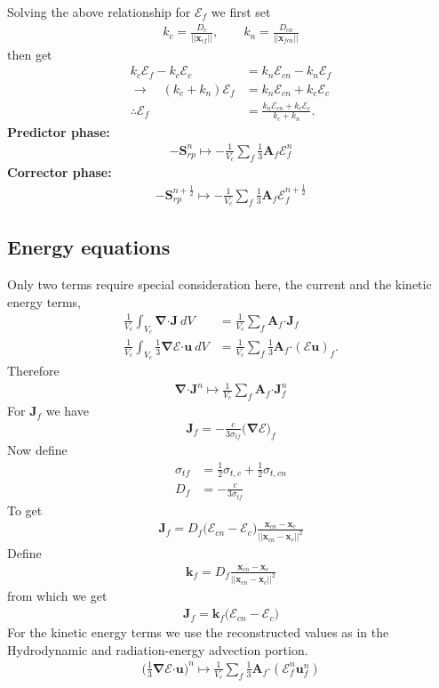 \documentclass[10pt,letterpaper,notitlepage]{article}
\numberwithin{equation}{section}
\newcommand{\bnabla}{\boldsymbol{\nabla}}
\newcommand{\position}{\mathbf{x}}
\newcommand{\velocity}{\mathbf{u}}
\newcommand{\dotp}{\boldsymbol{\cdot}}
\newcommand{\RadE}{\mathcal{E}}
\newcommand{\RadJ}{\mathbf{J}}
\newcommand{\AreaVec}{\mathbf{A}}
\newcommand{\half}{\frac{1}{2}}
\newcommand{\beq}{\begin{equation*} \begin{aligned}}
\newcommand{\eeq}{\end{aligned}\end{equation*}}
\newcommand{\beqn}{\begin{equation}\begin{aligned}}
\newcommand{\eeqn}{\end{aligned}\end{equation}}
\begin{document}
Solving the above relationship for $\RadE_f$ we first set
\beq 
k_c = \frac{D_c}{||\position_{cf}||} , \quad \quad
k_n = \frac{D_{cn}}{||\position_{fcn}||}
\eeq 
then get
\beqn 
k_c \RadE_f - k_c \RadE_c &= k_n \RadE_{cn} - k_n \RadE_f \\
\to \quad 
(k_c + k_n) \RadE_f &= k_n \RadE_{cn} + k_c \RadE_c \\
\therefore
\RadE_f &= \frac{k_n \RadE_{cn} + k_c \RadE_c}{k_c +k_n} .
\eeqn 
\newline
\newline 
\textbf{Predictor phase:} \newline 
\beqn
-\mathbf{S}_{rp} ^n\mapsto  -\frac{1}{V_c}  \sum_f  \frac{1}{3} \AreaVec_f \RadE_f^n
\eeqn
\textbf{Corrector phase:} \newline 
\beqn
-\mathbf{S}_{rp} ^{n+\half} \mapsto  -\frac{1}{V_c}  \sum_f  \frac{1}{3} \AreaVec_f \RadE_f^{n+\half}
\eeqn

\subsection{Energy equations}
Only two terms require special consideration here, the current and the kinetic energy terms,
\beqn 
\frac{1}{V_c} \int_{V_c} \bnabla \dotp \RadJ \ dV &= \frac{1}{V_c} \sum_f \AreaVec_f \dotp \RadJ_f \\
\frac{1}{V_c} \int_{V_c} \frac{1}{3} \bnabla \RadE \dotp \velocity \ dV &= \frac{1}{V_c} \sum_f \frac{1}{3} \AreaVec_f \dotp (\RadE \velocity)_f.
\eeqn 
Therefore
\beqn 
\bnabla \dotp \RadJ^n \mapsto \frac{1}{V_c} \sum_f \AreaVec_f \dotp \RadJ_f^n
\eeqn 
For $\RadJ_f$ we have
\beqn 
\RadJ_f = - \frac{c}{3\sigma_{tf}} \bigr(\bnabla \RadE \bigr)_f
\eeqn 
Now define
\beqn
\sigma_{tf} &= \half \sigma_{t,c} + \half \sigma_{t,cn} \\
D_f &= - \frac{c}{3\sigma_{tf}}
\eeqn 
To get
\beqn 
\RadJ_f = D_f \bigr( \RadE_{cn} - \RadE_{c} \bigr) \frac{\position_{cn} - \position_{c}}{|| \position_{cn} - \position_{c} ||^2}
\eeqn 
Define
\beqn 
\mathbf{k}_f = D_f \frac{\position_{cn} - \position_{c}}{|| \position_{cn} - \position_{c} ||^2}
\eeqn 
from which we get
\beqn 
\RadJ_f = \mathbf{k}_f \bigr( \RadE_{cn} - \RadE_{c} \bigr)
\eeqn 
\newline
\newline
For the kinetic energy terms we use the reconstructed values as in the Hydrodynamic and radiation-energy advection portion.
\beqn 
\biggr( \frac{1}{3} \bnabla \RadE \dotp \velocity \biggr)^n
\mapsto 
\frac{1}{V_c} \sum_f \frac{1}{3} \AreaVec_f \dotp (\RadE_f^n \velocity_f^n)
\eeqn 
\end{document}
